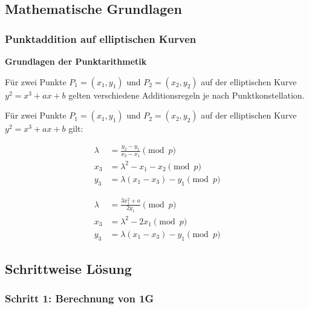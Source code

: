 \documentclass{article}
\begin{document}
\subsection{Mathematische Grundlagen}

\subsubsection{Punktaddition auf elliptischen Kurven}

\begin{infobox}
\textbf{Grundlagen der Punktarithmetik}

Für zwei Punkte $P_1 = (x_1, y_1)$ und $P_2 = (x_2, y_2)$ auf der elliptischen Kurve $y^2 = x^3 + ax + b$ gelten verschiedene Additionsregeln je nach Punktkonstellation.
\end{infobox}

Für zwei Punkte $P_1 = (x_1, y_1)$ und $P_2 = (x_2, y_2)$ auf der elliptischen Kurve $y^2 = x^3 + ax + b$ gilt:

\begin{tcolorbox}[colback=thd-blue!10,colframe=thd-blue,title=\textbf{Fall 1: Verschiedene Punkte ($P_1 \neq P_2$)}]
\begin{align}
\lambda &= \frac{y_2 - y_1}{x_2 - x_1} \pmod{p} \\
x_3 &= \lambda^2 - x_1 - x_2 \pmod{p} \\
y_3 &= \lambda(x_1 - x_3) - y_1 \pmod{p}
\end{align}
\end{tcolorbox}

\begin{tcolorbox}[colback=green!10,colframe=green!70!black,title=\textbf{Fall 2: Punktverdopplung ($P_1 = P_2$)}]
\begin{align}
\lambda &= \frac{3x_1^2 + a}{2y_1} \pmod{p} \\
x_3 &= \lambda^2 - 2x_1 \pmod{p} \\
y_3 &= \lambda(x_1 - x_3) - y_1 \pmod{p}
\end{align}
\end{tcolorbox}

\subsection{Schrittweise Lösung}

\subsubsection{Schritt 1: Berechnung von 1G}
\end{document}
